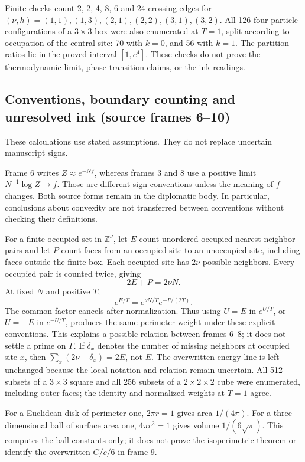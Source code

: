\documentclass[11pt]{article}
\begin{document}
Finite checks count 2, 2, 4, 8, 6 and 24 crossing edges for \((\nu,h)=(1,1),(1,3),(2,1),(2,2),(3,1),(3,2)\). All 126 four-particle configurations of a \(3\times3\) box were also enumerated at \(T=1\), split according to occupation of the central site: 70 with \(k=0\), and 56 with \(k=1\). The partition ratios lie in the proved interval \([1,e^4]\). These checks do not prove the thermodynamic limit, phase-transition claims, or the ink readings.

\subsection*{Conventions, boundary counting and unresolved ink (source frames 6–10)}
These calculations use stated assumptions. They do not replace uncertain manuscript signs.

Frame 6 writes \(Z\approx e^{-Nf}\), whereas frames 3 and 8 use a positive limit \(N^{-1}\log Z\to f\). Those are different sign conventions unless the meaning of \(f\) changes. Both source forms remain in the diplomatic body. In particular, conclusions about convexity are not transferred between conventions without checking their definitions.

For a finite occupied set in \(\mathbb Z^\nu\), let \(E\) count unordered occupied nearest-neighbor pairs and let \(P\) count faces from an occupied site to an unoccupied site, including faces outside the finite box. Each occupied site has \(2\nu\) possible neighbors. Every occupied pair is counted twice, giving
\[2E+P=2\nu N.\]
At fixed \(N\) and positive \(T\),
\[e^{E/T}=e^{\nu N/T}e^{-P/(2T)}.\]
The common factor cancels after normalization. Thus using \(U=E\) in \(e^{U/T}\), or \(U=-E\) in \(e^{-U/T}\), produces the same perimeter weight under these explicit conventions. This explains a possible relation between frames 6–8; it does not settle a prime on \(\Gamma\). If \(\delta_x\) denotes the number of missing neighbors at occupied site \(x\), then \(\sum_x(2\nu-\delta_x)=2E\), not \(E\). The overwritten energy line is left unchanged because the local notation and relation remain uncertain. All 512 subsets of a \(3\times3\) square and all 256 subsets of a \(2\times2\times2\) cube were enumerated, including outer faces; the identity and normalized weights at \(T=1\) agree.

For a Euclidean disk of perimeter one, \(2\pi r=1\) gives area \(1/(4\pi)\). For a three-dimensional ball of surface area one, \(4\pi r^2=1\) gives volume \(1/(6\sqrt\pi)\). This computes the ball constants only; it does not prove the isoperimetric theorem or identify the overwritten \(C/c/6\) in frame 9.
\end{document}
